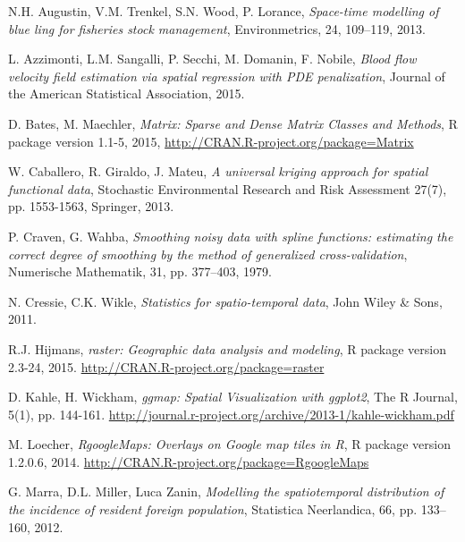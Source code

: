 \documentclass[a4paper,11pt,twoside,openright]{book}							%
\begin{document}
\begin{thebibliography}{99}


N.H. Augustin, V.M. Trenkel, S.N. Wood, P. Lorance, \emph{Space-time modelling of blue ling for fisheries stock management}, Environmetrics, 24, 109–119, 2013.

L. Azzimonti, L.M. Sangalli, P. Secchi, M. Domanin, F. Nobile, \emph{Blood flow velocity field estimation via spatial regression with PDE penalization}, Journal of the American Statistical Association, 2015.

D. Bates, M. Maechler, \emph{Matrix: Sparse and Dense Matrix Classes and Methods}, R package version 1.1-5, 2015, \href{http://CRAN.R-project.org/package=Matrix}{http://CRAN.R-project.org/package=Matrix}

W. Caballero, R. Giraldo, J. Mateu, \emph{A universal kriging approach for spatial functional data}, Stochastic Environmental Research and Risk Assessment 27(7), pp. 1553-1563, Springer, 2013.

P. Craven, G. Wahba, \emph{Smoothing noisy data with spline functions: estimating the correct degree of smoothing by the method of generalized cross-validation}, Numerische Mathematik, 31, pp. 377–403, 1979.

N. Cressie, C.K. Wikle, \emph{Statistics for spatio-temporal data}, John Wiley \& Sons, 2011.

R.J. Hijmans, \emph{raster: Geographic data analysis and modeling}, R package version 2.3-24, 2015. \href{http://CRAN.R-project.org/package=raster}{http://CRAN.R-project.org/package=raster}

D. Kahle, H. Wickham, \emph{ggmap: Spatial Visualization with ggplot2}, The R Journal, 5(1), pp. 144-161. \href{http://journal.r-project.org/archive/2013-1/kahle-wickham.pdf}{http://journal.r-project.org/archive/2013-1/kahle-wickham.pdf}

M. Loecher, \emph{RgoogleMaps: Overlays on Google map tiles in R}, R package version 1.2.0.6, 2014. \href{http://CRAN.R-project.org/package=RgoogleMaps}{http://CRAN.R-project.org/package=RgoogleMaps}

G. Marra, D.L. Miller, Luca Zanin, \emph{Modelling the spatiotemporal distribution of the incidence of resident foreign population}, Statistica Neerlandica, 66, pp. 133–160, 2012.


\end{thebibliography}
\end{document}
